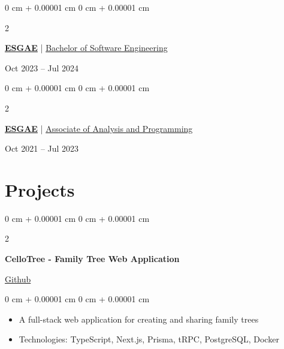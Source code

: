 \documentclass[10pt, letterpaper]{article}
\newenvironment{highlights}{
  \begin{itemize}[
    topsep=0.10 cm,
    parsep=0.10 cm,
    partopsep=0pt,
    itemsep=0pt,
    leftmargin=0 cm + 10pt
  ]
}{
  \end{itemize}
} %
\newenvironment{onecolentry}{
  \begin{adjustwidth}{
    0 cm + 0.00001 cm
  }{
    0 cm + 0.00001 cm
  }
}{
  \end{adjustwidth}
} %
\newenvironment{twocolentry}[2][]{
  \onecolentry
    \def\secondColumn{#2}
  \setcolumnwidth{\fill, 4.5 cm}
  \begin{paracol}{2}
}{
  \switchcolumn \raggedleft \secondColumn
    \end{paracol}
  \endonecolentry
} %
\begin{document}
\vspace{0.10 cm}
\begin{twocolentry}{
    Oct 2023 – Jul 2024
}
\textbf{\href{https://esgae.org/}{ESGAE}} | \href{https://drive.google.com/file/d/1XByQTQBimuyxj4Y3iiMretpPVR5-1aT8/view?usp=sharing}{Bachelor of Software Engineering}
\end{twocolentry}

\vspace{0.10 cm}

\begin{twocolentry}{
    Oct 2021 – Jul 2023
}
\textbf{\href{https://esgae.org/}{ESGAE}} | \href{https://drive.google.com/file/d/1yH2_KIsGoWv-wQOauQIn6xb9ZHOo6eEs/view?usp=sharing}{Associate of Analysis and Programming}
\end{twocolentry}

\vspace{0.10 cm}

\section{Projects}

\begin{twocolentry}{
  \href{https://github.com/ssnnee/cellotree_web}{Github}
}
\textbf{CelloTree - Family Tree Web Application}
\end{twocolentry}

\vspace{0.10 cm}
\begin{onecolentry}
\begin{highlights}
\item A full-stack web application for creating and sharing family trees
\item Technologies: TypeScript, Next.js, Prisma, tRPC, PostgreSQL, Docker
\end{highlights}
\end{onecolentry}
\end{document}
